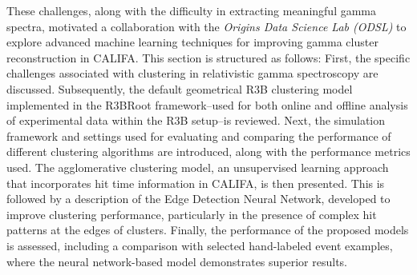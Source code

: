 These challenges, along with the difficulty in extracting meaningful gamma spectra, motivated a collaboration with the \textit{Origins Data Science Lab (ODSL)} to explore advanced machine learning techniques for improving gamma cluster reconstruction in CALIFA.\newline
This section is structured as follows:\newline
First, the specific challenges associated with clustering in relativistic gamma spectroscopy are discussed. Subsequently, the default geometrical R3B clustering model implemented in the R3BRoot framework--used for both online and offline analysis of experimental data within the R3B setup--is reviewed.\newline
Next, the simulation framework and settings used for evaluating and comparing the performance of different clustering algorithms are introduced, along with the performance metrics used.\newline
The agglomerative clustering model, an unsupervised learning approach that incorporates hit time information in CALIFA, is then presented.\newline
This is followed by a description of the Edge Detection Neural Network, developed to improve clustering performance, particularly in the presence of complex hit patterns at the edges of clusters.\newline
Finally, the performance of the proposed models is assessed, including a comparison with selected hand-labeled event examples, where the neural network-based model demonstrates superior results.

